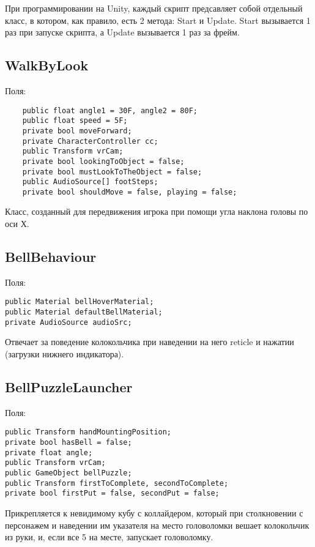 При программировании на Unity, каждый скрипт предсавляет собой отдельный класс, в котором, как правило, есть 2 метода: Start и Update. Start вызывается 1 раз при запуске скрипта, а Update вызывается 1 раз за фрейм. 

\subsection{WalkByLook}
Поля:\\
\begin{small}
    \begin{verbatim}
    public float angle1 = 30F, angle2 = 80F;
    public float speed = 5F;
    private bool moveForward;
    private CharacterController cc;
    public Transform vrCam;
    private bool lookingToObject = false;
    private bool mustLookToTheObject = false;
    public AudioSource[] footSteps;
    private bool shouldMove = false, playing = false;
    \end{verbatim}
\end{small}
Класс, созданный для передвижения игрока при помощи угла наклона головы по оси Х.

\subsection{BellBehaviour}
Поля:\\
\begin{small}
    \begin{verbatim}
public Material bellHoverMaterial;
public Material defaultBellMaterial;
private AudioSource audioSrc;
    \end{verbatim}
\end{small}
Отвечает за поведение колокольчика при наведении на него reticle и нажатии (загрузки нижнего индикатора).
\subsection{BellPuzzleLauncher}
Поля:\\
\begin{small}
    \begin{verbatim}
public Transform handMountingPosition;
private bool hasBell = false;
private float angle;
public Transform vrCam;
public GameObject bellPuzzle;
public Transform firstToComplete, secondToComplete;
private bool firstPut = false, secondPut = false;
    \end{verbatim}
\end{small}
Прикрепляется к невидимому кубу с коллайдером, который при столкновении с персонажем и наведении им указателя на место головоломки вешает колокольчик из руки, и, если все 5 на месте, запускает головоломку. 

